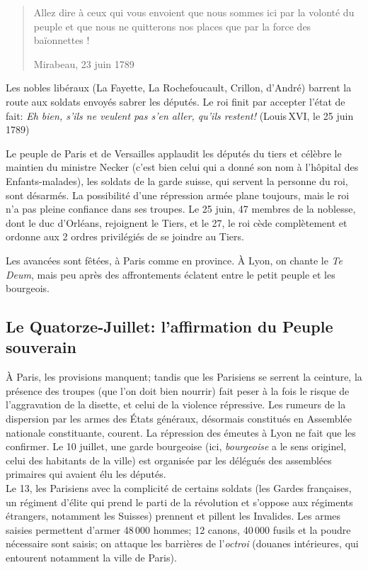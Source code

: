 \documentclass[
  french,
  letterpaper,
  DIV=11,
  numbers=noendperiod]{scrartcl}
\begin{document}
\begin{quote}
Allez dire à ceux qui vous envoient que nous sommes ici par la volonté
du peuple et que nous ne quitterons nos places que par la force des
baïonnettes !

Mirabeau, 23 juin 1789
\end{quote}

Les nobles libéraux (La Fayette, La Rochefoucault, Crillon, d'André)
barrent la route aux soldats envoyés sabrer les députés. Le roi finit
par accepter l'état de fait: \emph{Eh bien, s'ils ne veulent pas s'en
aller, qu'ils restent!} (Louis\,XVI, le 25 juin 1789)

Le peuple de Paris et de Versailles applaudit les députés du tiers et
célèbre le maintien du ministre Necker (c'est bien celui qui a donné son
nom à l'hôpital des Enfants-malades), les soldats de la garde suisse,
qui servent la personne du roi, sont désarmés. La possibilité d'une
répression armée plane toujours, mais le roi n'a pas pleine confiance
dans ses troupes. Le 25 juin, 47 membres de la noblesse, dont le duc
d'Orléans, rejoignent le Tiers, et le 27, le roi cède complètement et
ordonne aux 2 ordres privilégiés de se joindre au Tiers.

Les avancées sont fêtées, à Paris comme en province. À Lyon, on chante
le \emph{Te Deum}, mais peu après des affrontements éclatent entre le
petit peuple et les bourgeois.

\subsection{Le Quatorze-Juillet: l'affirmation du Peuple
souverain}\label{le-quatorze-juillet-laffirmation-du-peuple-souverain}

À Paris, les provisions manquent; tandis que les Parisiens se serrent la
ceinture, la présence des troupes (que l'on doit bien nourrir) fait
peser à la fois le risque de l'aggravation de la disette, et celui de la
violence répressive. Les rumeurs de la dispersion par les armes des
États généraux, désormais constitués en Assemblée nationale
constituante, courent. La répression des émeutes à Lyon ne fait que les
confirmer. Le 10 juillet, une garde bourgeoise (ici, \emph{bourgeoise} a
le sens originel, celui des habitants de la ville) est organisée par les
délégués des assemblées primaires qui avaient élu les députés.\\
Le 13, les Parisiens avec la complicité de certains soldats (les Gardes
françaises, un régiment d'élite qui prend le parti de la révolution et
s'oppose aux régiments étrangers, notamment les Suisses) prennent et
pillent les Invalides. Les armes saisies permettent d'armer 48\,000
hommes; 12 canons, 40\,000 fusils et la poudre nécessaire sont saisis;
on attaque les barrières de l'\emph{octroi} (douanes intérieures, qui
entourent notamment la ville de Paris).
\end{document}
